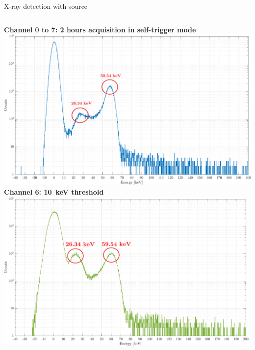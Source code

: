\documentclass[aspectratio=169,xcolor=dvipsnames]{beamer} %
\begin{document}

\begin{frame}{X-ray detection with  source}
    \addtolength{\leftmargini}{\labelsep}
    \fontsize{9pt}{1}\selectfont
    \vspace{0.1cm}
    \begin{columns}
            \centering
            \textbf{\hspace{0.7cm}Channel 0 to 7: 2 hours acquisition in self-trigger mode}
            \vskip0.1cm
            \includegraphics[width=1.06\textwidth]{images/muon_detection/americium/ch4_americio_log.pdf}
            \centering
            \fontsize{8.5pt}{1}\selectfont
            \textbf{Channel 6: \SI{10}{\kilo\electronvolt} threshold}
            \vskip0.1cm
            \includegraphics[width=0.99\textwidth]{images/muon_detection/americium/ch4_americio_log_ch6.pdf}

\end{columns}
\end{frame}
\end{document}
